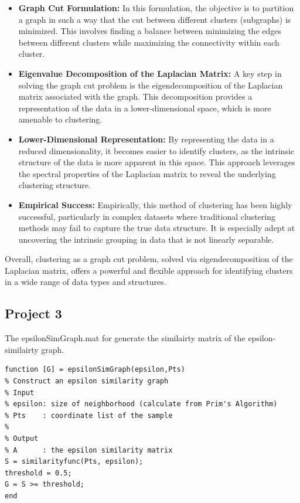 \documentclass[unicode,11pt,a4paper,oneside,numbers=endperiod,openany]{scrartcl}
\begin{document}
\begin{itemize}
    \item \textbf{Graph Cut Formulation:} In this formulation, the objective is to partition a graph in such a way that the cut between different clusters (subgraphs) is minimized. This involves finding a balance between minimizing the edges between different clusters while maximizing the connectivity within each cluster.

    \item \textbf{Eigenvalue Decomposition of the Laplacian Matrix:} A key step in solving the graph cut problem is the eigendecomposition of the Laplacian matrix associated with the graph. This decomposition provides a representation of the data in a lower-dimensional space, which is more amenable to clustering.

    \item \textbf{Lower-Dimensional Representation:} By representing the data in a reduced dimensionality, it becomes easier to identify clusters, as the intrinsic structure of the data is more apparent in this space. This approach leverages the spectral properties of the Laplacian matrix to reveal the underlying clustering structure.

    \item \textbf{Empirical Success:} Empirically, this method of clustering has been highly successful, particularly in complex datasets where traditional clustering methods may fail to capture the true data structure. It is especially adept at uncovering the intrinsic grouping in data that is not linearly separable.
\end{itemize}

Overall, clustering as a graph cut problem, solved via eigendecomposition of the Laplacian matrix, offers a powerful and flexible approach for identifying clusters in a wide range of data types and structures.

\subsection{Project 3}

The epsilonSimGraph.mat for generate the similairty matrix of the epsilon-similairty graph.
\begin{lstlisting}
function [G] = epsilonSimGraph(epsilon,Pts)
% Construct an epsilon similarity graph
% Input
% epsilon: size of neighborhood (calculate from Prim's Algorithm)
% Pts    : coordinate list of the sample
%
% Output
% A      : the epsilon similarity matrix
S = similarityfunc(Pts, epsilon);
threshold = 0.5;
G = S >= threshold;
end
\end{lstlisting}
\end{document}
